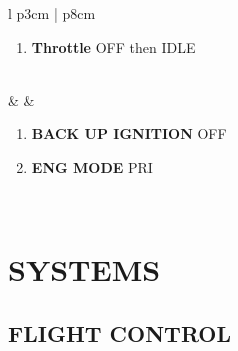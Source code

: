 \documentclass[fontHelvetica, widesubsec]{TechCheck}
\begin{document}
\begin{center}
\begin{longtable}{l p{3cm} | p{8cm}}
\begin{minipage}[t]{\linewidth}
\begin{enumerate}[label=(\alph*), resume]
					\item \textbf{Throttle} \dotfill OFF then IDLE
				\end{enumerate}
			\end{minipage} \\
			\midrule
			\textbf{\textbf{\textbullet}} &  &
			\begin{minipage}[t]{\linewidth}
				\vspace{-7pt}
				\begin{enumerate}
					\item \textbf{BACK UP IGNITION} \dotfill OFF
					\item \textbf{ENG MODE} \dotfill PRI
				\end{enumerate}
			\end{minipage} \\
			\bottomrule
		\end{longtable}
	\end{center}

	\cleardoublepage

	\chapter{SYSTEMS}
	\minitoc
	\cleardoublepage

	\section{FLIGHT CONTROL}
	\thumbnar
\end{document}

